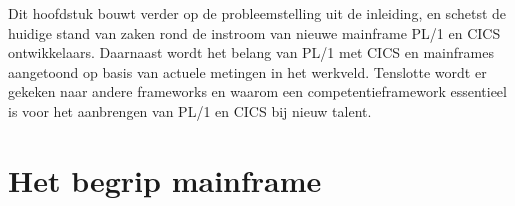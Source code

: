 





Dit hoofdstuk bouwt verder op de probleemstelling uit de inleiding, en schetst de huidige stand van zaken rond de instroom van nieuwe mainframe PL/1 en CICS ontwikkelaars.
Daarnaast wordt het belang van PL/1 met CICS en mainframes aangetoond op basis van actuele metingen in het werkveld.
Tenslotte wordt er gekeken naar andere frameworks en waarom een competentieframework essentieel is voor het aanbrengen van PL/1 en CICS bij nieuw talent.

\section{Het begrip mainframe}%
\label{sec:begrip-mainframe}

